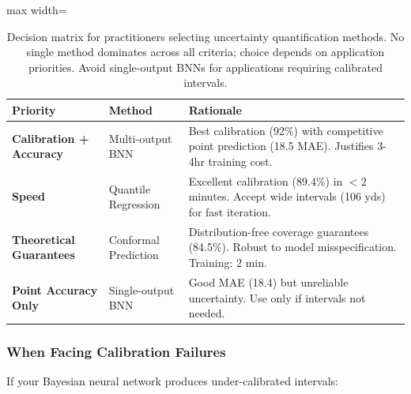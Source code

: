 \begin{table}[t]
\centering
\begin{adjustbox}{max width=\textwidth}
\begin{tabular}{@{}llp{6cm}@{}}
\toprule
\textbf{Priority}  & \textbf{Method}  & \textbf{Rationale} \\
\midrule
\textbf{Calibration + Accuracy} & Multi-output BNN & Best calibration (92\%) with competitive point prediction (18.5 MAE). Justifies 3-4hr training cost. \\
\addlinespace
\textbf{Speed} & Quantile Regression & Excellent calibration (89.4\%) in $<2$ minutes. Accept wide intervals (106 yds) for fast iteration. \\
\addlinespace
\textbf{Theoretical Guarantees} & Conformal Prediction & Distribution-free coverage guarantees (84.5\%). Robust to model misspecification. Training: 2 min. \\
\addlinespace
\textbf{Point Accuracy Only} & Single-output BNN & Good MAE (18.4) but unreliable uncertainty. Use only if intervals not needed. \\
\bottomrule
\end{tabular}
\end{adjustbox}
\caption{Decision matrix for practitioners selecting uncertainty quantification methods. No single method dominates across all criteria; choice depends on application priorities. Avoid single-output BNNs for applications requiring calibrated intervals.}
\label{tab:practitioner_decision_matrix}
\end{table}

\subsubsection{When Facing Calibration Failures}

If your Bayesian neural network produces under-calibrated intervals:


